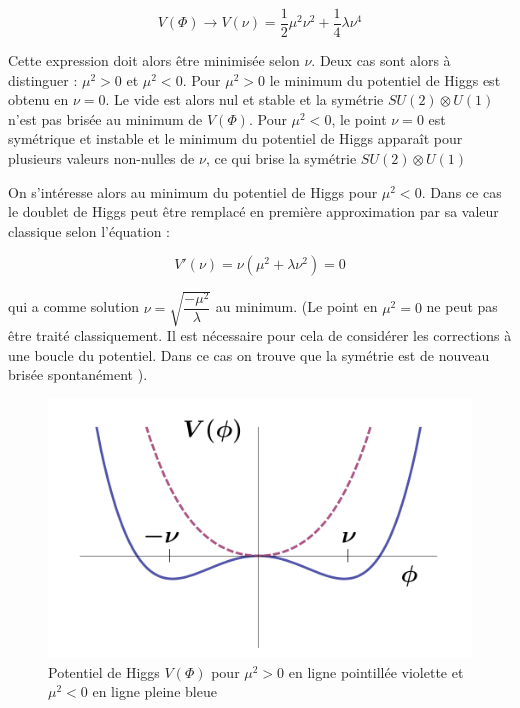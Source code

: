   \begin{equation}
   V(\Phi) \rightarrow V(\nu) = \dfrac{1}{2} \mu^2 \nu^2 + \dfrac{1}{4} \lambda \nu^4
  \end{equation}

  Cette expression doit alors \^etre minimis\'ee selon $\nu$. Deux cas sont alors \`a distinguer : $\mu^2 > 0$ et $\mu^2 < 0$. Pour $\mu^2>0$ le minimum du potentiel de Higgs est obtenu en $\nu=0$. Le vide est alors nul et stable et la sym\'etrie $SU(2) \otimes U(1)$ n'est pas bris\'ee au minimum de $V(\Phi)$. Pour $\mu^2 < 0$, le point $\nu=0$ est sym\'etrique et instable et le minimum du potentiel de Higgs appara\^it pour plusieurs valeurs non-nulles de $\nu$, ce qui brise la sym\'etrie $SU(2) \otimes U(1)$
  
  \medskip
  
  On s'int\'eresse alors au minimum du potentiel de Higgs pour $\mu^2 < 0$. Dans ce cas le doublet de Higgs peut \^etre remplac\'e en premi\`ere approximation par sa valeur classique selon l'\'equation :
  
  \begin{equation}
   V'(\nu) = \nu(\mu^2 + \lambda \nu^2) = 0
  \end{equation}

  qui a comme solution $\nu = \sqrt{\dfrac{-\mu^2}{\lambda}}$ au minimum. (Le point en $\mu^2 = 0$ ne peut pas \^etre trait\'e classiquement. Il est n\'ecessaire pour cela de consid\'erer les corrections \`a une boucle du potentiel. Dans ce cas on trouve que la sym\'etrie est de nouveau bris\'ee spontan\'ement \cite{Coleman:1973jx}).
  
    \begin{figure}[!htb]
    \begin{center} 
      \includegraphics[scale=0.30]{./figures/potentiel_Higgs.png}
      \caption{ Potentiel de Higgs $V(\Phi)$ pour $\mu^2>0$ en ligne pointill\'ee violette et $\mu^2<0$ en ligne pleine bleue  }
      \label{fig:feynmanHiggs}
    \end{center}
  \end{figure} 
  
